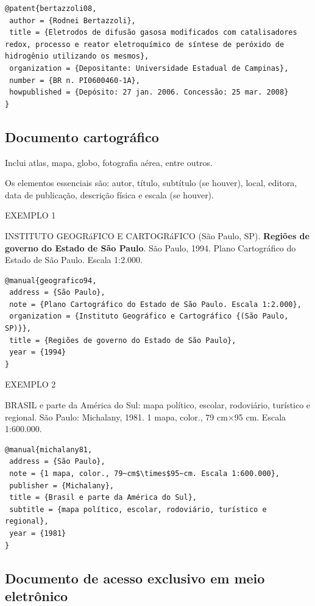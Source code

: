 \begin{verbatim}
@patent{bertazzoli08,
 author = {Rodnei Bertazzoli},
 title = {Eletrodos de difusão gasosa modificados com catalisadores redox, processo e reator eletroquímico de síntese de peróxido de hidrogênio utilizando os mesmos},
 organization = {Depositante: Universidade Estadual de Campinas},
 number = {BR n. PI0600460-1A},
 howpublished = {Depósito: 27 jan. 2006. Concessão: 25 mar. 2008}
}
\end{verbatim}

\subsection{Documento cartográfico}

Inclui atlas, mapa, globo, fotografia aérea, entre outros.

Os elementos essenciais são: autor, título, subtítulo (se houver), local, editora, data de publicação, descrição física e escala (se houver). 

EXEMPLO 1 

INSTITUTO GEOGRáFICO E CARTOGRáFICO (São Paulo, SP). \textbf{Regiões de governo do Estado de São Paulo}. São Paulo, 1994. Plano Cartográfico do Estado de São Paulo. Escala 1:2.000.

\begin{verbatim}
@manual{geografico94,
 address = {São Paulo},
 note = {Plano Cartográfico do Estado de São Paulo. Escala 1:2.000},
 organization = {Instituto Geográfico e Cartográfico {(São Paulo, SP)}},
 title = {Regiões de governo do Estado de São Paulo},
 year = {1994}
}
\end{verbatim}

EXEMPLO 2

BRASIL e parte da América do Sul: mapa político, escolar, rodoviário, turístico e regional. São Paulo: Michalany, 1981. 1 mapa, color., 79 cm$\times$95 cm. Escala 1:600.000.

\begin{verbatim}
@manual{michalany81,
 address = {São Paulo},
 note = {1 mapa, color., 79~cm$\times$95~cm. Escala 1:600.000},
 publisher = {Michalany},
 title = {Brasil e parte da América do Sul},
 subtitle = {mapa político, escolar, rodoviário, turístico e regional},
 year = {1981}
}
\end{verbatim}

\subsection{Documento de acesso exclusivo em meio eletrônico}


